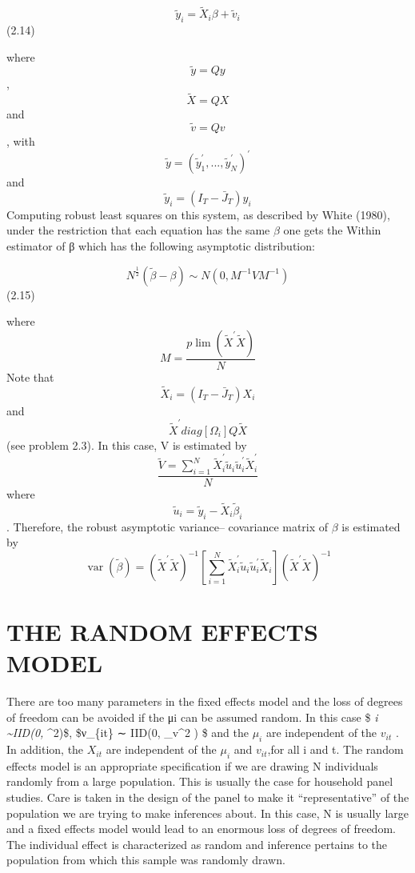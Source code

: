\documentclass[
]{book}
\begin{document}
\[  \widetilde {y}_i=\widetilde{X}_{i} \beta + \widetilde{v}_{i}  \]
(2.14)

where \[\widetilde{y}=Qy \] , \[\widetilde{X}=QX \] and \[\widetilde{v}=Qv \] ,
with \[\widetilde{y}=(\widetilde{y}_1^{\prime}, ...,\widetilde{y}_N^{\prime} )^{\prime} \] and \[\widetilde{y}_i=(I_T-\bar{J}_T) y_i \] Computing
robust least squares on this system, as described by White (1980), under the restriction
that each equation has the same \(\beta\) one gets the Within estimator of β which has the following
asymptotic distribution:

\[N^{\frac{1}{2} }  (\widetilde{\beta}- \beta ) \sim N(0,M^{-1}VM^{-1} ) \]
(2.15)

where
\[M=\frac{ p\lim(\widetilde{X}^{\prime} \widetilde{X})} {N} \]
Note that \[\widetilde{X}_i=(I_T - \bar{J}_T) X_i  \] and \[\widetilde{X}^{\prime} diag[\Omega_i] Q \widetilde{X} \] (see problem 2.3). In this case, V is estimated by
\[ \frac{  \widetilde{V}=\sum_{i=1}^{N} \widetilde{X}_i^{\prime}\widetilde{u}_i \widetilde{u}_i^{\prime}\widetilde{X}_i^{\prime} } {N}  \]
where \[\widetilde{u}_i=\widetilde{y}_i- \widetilde{X}_i \widetilde{\beta}_i\] .
Therefore, the robust asymptotic variance--
covariance matrix of \(\beta\) is estimated by
\[
\operatorname{var}(\widetilde{\beta})=\left(\widetilde{X}^{\prime} \tilde{X}\right)^{-1}\left[\sum_{i=1}^{N} \widetilde{X}_{i}^{\prime} \tilde{u}_{i} \tilde{u}_{i}^{\prime} \widetilde{X}_{i}\right]\left(\widetilde{X}^{\prime} \tilde{X}\right)^{-1}
\]

\hypertarget{the-random-effects-model}{%
\section{THE RANDOM EFFECTS MODEL}\label{the-random-effects-model}}

There are too many parameters in the fixed effects model and the loss of degrees of freedom can be avoided if the μi can be assumed random. In this case
\$ \mu\emph{i \sim IID(0, \sigma}\mu\^{}2)\$,
\$ν\_\{it\} ∼ IID(0, \sigma\_v\^{}2 ) \$
and the \(\mu_i\) are independent of the \(v_{it}\) . In addition, the \(X_{it}\) are independent of the \(\mu_i\) and \(v_{it}\),for all i and t. The random effects model is an appropriate specification if we are drawing N individuals randomly from a large population. This is usually the case for household panel studies. Care is taken in the design of the panel to make it ``representative'' of the population we are trying to make inferences about. In this case, N is usually large and a fixed effects model would lead to an enormous loss of degrees of freedom. The individual effect is characterized as random and inference pertains to the population from which this sample was randomly drawn.
\end{document}
